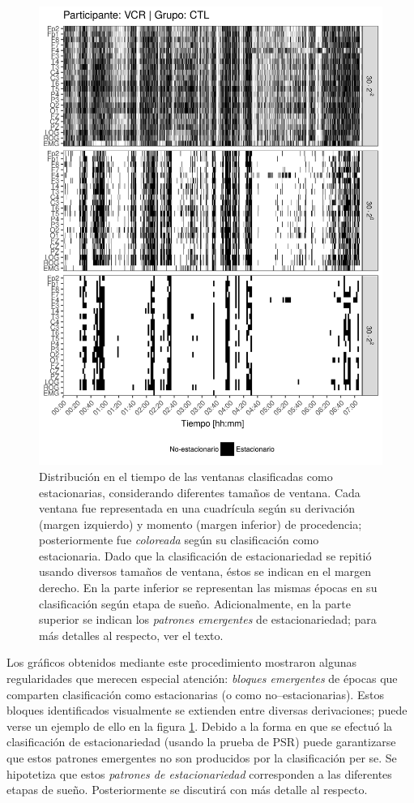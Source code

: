 \begin{figure}
\centering
\includegraphics[width=.8\linewidth]
{./img_art_dfa/VCNNS1_comp_est_.png}
\caption[Distribución en el tiempo de las ventanas clasificadas como estacionarias, considerando diferentes tamaños de ventana]{Distribución en el tiempo de las ventanas clasificadas como estacionarias, considerando diferentes tamaños de ventana. 
Cada ventana fue representada en una cuadrícula según su derivación (margen izquierdo) y momento (margen inferior) de procedencia; posteriormente fue \textit{coloreada} según su clasificación como estacionaria.
Dado que la clasificación de estacionariedad se repitió usando diversos tamaños de ventana, éstos se indican en el margen derecho.
En la parte inferior se representan las mismas épocas en su clasificación según etapa de sueño.
Adicionalmente, en la parte superior se indican los \textit{patrones emergentes} de estacionariedad; para más detalles al respecto, ver el texto.}
\label{img:patrones}
\end{figure}

Los gráficos obtenidos mediante este procedimiento mostraron algunas regularidades que merecen especial atención: \textit{bloques emergentes} de épocas que comparten clasificación como estacionarias (o como no--estacionarias).
%
Estos bloques identificados visualmente se extienden entre diversas derivaciones; puede verse un ejemplo de ello en la figura \ref{img:patrones}.
%
Debido a la forma en que se efectuó la clasificación de estacionariedad (usando la prueba de PSR) puede garantizarse que estos patrones emergentes no son producidos por la clasificación per se.
%
Se hipotetiza que estos \textit{patrones de estacionariedad}
corresponden a las diferentes etapas de sueño.
%
Posteriormente se discutirá con más detalle al respecto.

